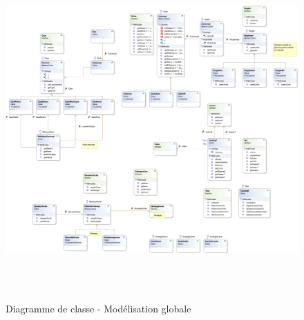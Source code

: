 \documentclass[a4paper,11pt]{article}
\begin{document}
	\vspace*{0.5cm}
	\begin{figure}[ht!]
		\includegraphics[height=13cm,width=15cm]{Diagrammes/Classe/classe.png}
		\caption{Diagramme de classe - Modélisation globale}
		\label{fig:classe}
	\end{figure}
	\newpage
\end{document}
